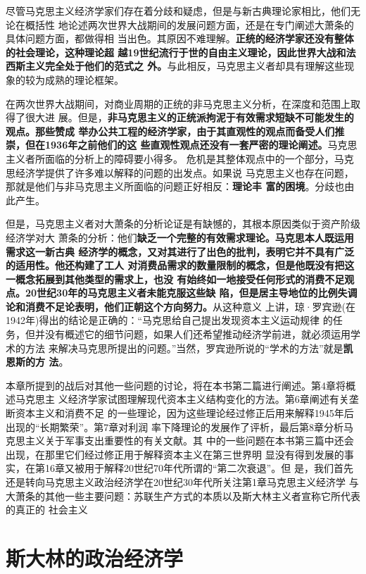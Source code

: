 尽管马克思主义经济学家们存在着分歧和疑虑，但是与新古典理论家相比，他们无论在概括性
地论述两次世界大战期间的发展问题方面，还是在专门阐述大萧条的具体问题方面，都做得相
当出色。其原因不难理解。\textbf{正统的经济学家还没有整体的社会理论，这种理论超
越19世纪流行于世的自由主义理论，因此世界大战和法西斯主义完全处于他们的范式之
外。}与此相反，马克思主义者却具有理解这些现象的较为成熟的理论框架。

在两次世界大战期间，对商业周期的正统的非马克思主义分析，在深度和范围上取得了很大进
展。但是，\textbf{非马克思主义的正统派拘泥于有效需求短缺不可能发生的观点。那些赞成
举办公共工程的经济学家，由于其直观性的观点而备受人们推崇，但在1936年之前他们的这
些直观性观点还没有一套严密的理论阐述。}马克思主义者所面临的分析上的障碍要小得多。
危机是其整体观点中的一个部分，马克思经济学提供了许多难以解释的问题的出发点。如果说
马克思主义也存在问题，那就是他们与非马克思主义所面临的问题正好相反：\textbf{理论丰
富的困境}。分歧也由此产生。

但是，马克思主义者对大萧条的分析论证是有缺憾的，其根本原因类似于资产阶级经济学对大
萧条的分析：他们\textbf{缺乏一个完整的有效需求理论。马克思本人既运用需求这一新古典
经济学的概念，又对其进行了出色的批判，表明它并不具有广泛的适用性。他还构建了工人
对消费品需求的数量限制的概念，但是他既没有把这一概念拓展到其他类型的需求上，也没
有始终如一地接受任何形式的消费不足观点。20世纪30年的马克思主义者未能克服这些缺
陷，但是居主导地位的比例失调论和消费不足论表明，他们正朝这个方向努力。}从这种意义
上讲，琼·罗宾逊(在1942年)得出的结论是正确的：“马克思给自己提出发现资本主义运动规律
的任务，但并没有概述它的细节问题，如果人们还希望推动经济学前进，就必须运用学术的方法
来解决马克思所提出的问题。”当然，罗宾逊所说的“学术的方法”就是\textbf{凯恩斯的方
法}。

本章所提到的战后对其他一些问题的讨论，将在本书第二篇进行阐述。第4章将概述马克思主
义经济学家试图理解现代资本主义结构变化的方法。第6章阐述有关垄断资本主义和消费不足
的一些理论，因为这些理论经过修正后用来解释1945年后出现的“长期繁荣”。第7章对利润
率下降理论的发展作了评析，最后第8章分析马克思主义关于军事支出重要性的有关文献。其
中的一些问题在本书第三篇中还会出现，在那里它们经过修正用于解释资本主义在第三世界明
显没有得到发展的事实，在第16章又被用于解释20世纪70年代所谓的“第二次衰退”。但
是，我们首先还是转向马克思主义政治经济学在20世纪30年代所关注第1章马克思主义经济学
与大萧条的其他一些主要问题：苏联生产方式的本质以及斯大林主义者宣称它所代表的真正的
社会主义


\chapter{斯大林的政治经济学}
